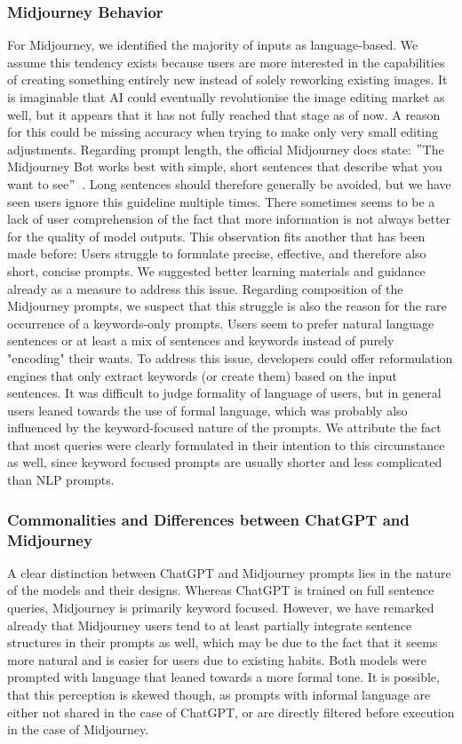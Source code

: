 \subsubsection{Midjourney Behavior}
For Midjourney, we identified the majority of inputs as language-based.
We assume this tendency exists because users are more interested in the capabilities of creating
something entirely new instead of solely reworking existing images.
It is imaginable that AI could eventually revolutionise the image editing market as well, but
it appears that it has not fully reached that stage as of now.
A reason for this could be missing accuracy when trying to make only very small editing adjustments.
Regarding prompt length, the official Midjourney docs state: \("\)The Midjourney Bot works best with
simple, short sentences that describe what you want to see\("\)~\cite{midjourney_documentation_2023}.
Long sentences should therefore generally be avoided, but we have seen users ignore this guideline
multiple times.
There sometimes seems to be a lack of user comprehension of the fact that more information is not
always better for the quality of model outputs.
This observation fits another that has been made before:
Users struggle to formulate precise, effective, and therefore also short, concise prompts.
We suggested better learning materials and guidance already as a measure to address this issue.
Regarding composition of the Midjourney prompts, we suspect that this struggle is also the reason
for the rare occurrence of a keywords-only prompts.
Users seem to prefer natural language sentences or at least a mix of sentences and keywords
instead of purely "encoding" their wants.
To address this issue, developers could offer reformulation engines that only extract keywords (or
create them) based on the input sentences.
It was difficult to judge formality of language of users, but in general users leaned towards the
use of formal language, which was probably also influenced by the keyword-focused nature of the prompts.
We attribute the fact that most queries were clearly formulated in their intention to this
circumstance as well,
since keyword focused prompts are usually shorter and less complicated than NLP prompts.

\subsubsection{Commonalities and Differences between ChatGPT and Midjourney}
A clear distinction between ChatGPT and Midjourney prompts lies in the nature of the models and
their designs.
Whereas ChatGPT is trained on full sentence queries, Midjourney is primarily keyword focused.
However, we have remarked already that Midjourney users tend to at least partially integrate
sentence structures in their prompts as well, which may be due to the fact that it seems more
natural and is easier for users due to existing habits.
Both models were prompted with language that leaned towards a more formal tone.
It is possible, that this perception is skewed though, as prompts with informal language are
either not shared in the case of ChatGPT, or are directly filtered before execution in the case
of Midjourney.

